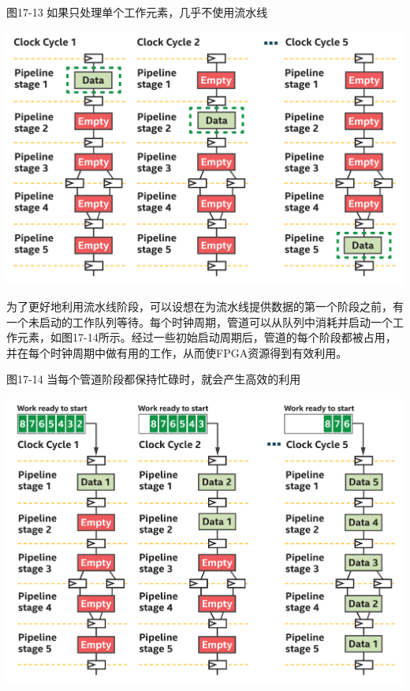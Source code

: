 \hspace*{\fill} \par %
图17-13 如果只处理单个工作元素，几乎不使用流水线
\begin{center}
	\includegraphics[width=1.0\textwidth]{content/chapter-17/images/12}
\end{center}

为了更好地利用流水线阶段，可以设想在为流水线提供数据的第一个阶段之前，有一个未启动的工作队列等待。每个时钟周期，管道可以从队列中消耗并启动一个工作元素，如图17-14所示。经过一些初始启动周期后，管道的每个阶段都被占用，并在每个时钟周期中做有用的工作，从而使FPGA资源得到有效利用。\par

\hspace*{\fill} \par %
图17-14 当每个管道阶段都保持忙碌时，就会产生高效的利用
\begin{center}
	\includegraphics[width=1.0\textwidth]{content/chapter-17/images/13}
\end{center}

